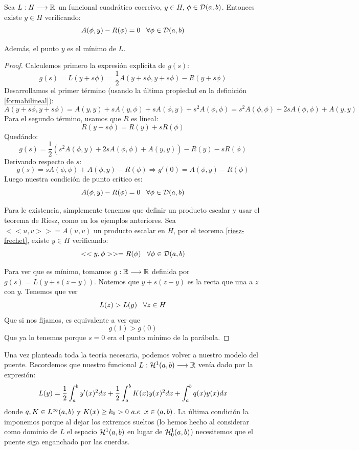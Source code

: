 \begin{prop}
\label{puntocritico}
Sea $L : H \longrightarrow \mathbb{R}$ un funcional cuadrático coercivo, $y\in H$, $\phi\in\mathcal{D}(a,b)$. Entonces existe $y\in H$ verificando:
\[
A(\phi,y)-R(\phi)=0 \;\;\; \forall\phi\in\mathcal{D}(a,b)
\]

Además, el punto $y$ es el mínimo de $L$.
\end{prop}
\begin{proof}
Calculemos primero la expresión explícita de $g(s)$:
\[
g(s)=L(y+s\phi)=\frac{1}{2}A(y+s\phi,y+s\phi)-R(y+s\phi)
\]
Desarrollamos el primer término (usando la última propiedad en la definición \ref{formabilineal}):
\[
A(y+s\phi,y+s\phi)=A(y,y)+sA(y,\phi)+sA(\phi,y)+s^2A(\phi,\phi)=s^2A(\phi,\phi)+2sA(\phi,\phi)+A(y,y)
\]
Para el segundo término, usamos que $R$ es lineal:
\[
R(y+s\phi)=R(y)+sR(\phi)
\]
Quedándo:
\[
g(s)=\frac{1}{2}\left(s^2A(\phi,y)+2sA(\phi,\phi)+A(y,y)\right)-R(y)-sR(\phi)
\]
Derivando respecto de $s$:
\[
g(s)=sA(\phi,\phi)+A(\phi,y)-R(\phi) \Rightarrow g'(0)=A(\phi,y)-R(\phi)
\]
Luego nuestra condición de punto crítico es:
\[
A(\phi,y)-R(\phi)=0 \;\;\; \forall\phi\in\mathcal{D}(a,b)
\]

Para le existencia, simplemente tenemos que definir un producto escalar y usar el teorema de Riesz, como en los ejemplos anteriores. Sea $<<u,v>>=A(u,v)$ un producto escalar en $H$, por el teorema \ref{riesz-frechet}, existe $y\in H$ verificando:
\[
<<y,\phi>>=R(\phi) \;\;\; \forall \phi\in\mathcal{D}(a,b)
\]

Para ver que es mínimo, tomamos $g : \mathbb{R} \longrightarrow \mathbb{R}$ definida por $g(s)=L(y+s(z-y))$. Notemos que $y+s(z-y)$ es la recta que una a $z$ con $y$. Tenemos que ver
\[
L(z)>L(y) \;\;\; \forall z\in H
\]
Que si nos fijamos, es equivalente a ver que
\[
g(1)>g(0)
\]
Que ya lo tenemos porque $s=0$ era el punto mínimo de la parábola.
\end{proof}

Una vez planteada toda la teoría necesaria, podemos volver a nuestro modelo del puente. Recordemos que nuestro funcional  $L : \mathcal{H}^{ 1 } (a,b) \longrightarrow \mathbb{R}$ venía dado por la expresión:
\[
L(y)=\frac{1}{2}\displaystyle\int_{ a }^{ b } y'(x)^2dx+\frac{1}{2}\displaystyle\int_{ a }^{ b } K(x)y(x)^2dx+\displaystyle\int_{ a }^{ b } q(x)y(x)dx
\]
donde $q,K\in L^{ \infty }(a,b)$ y $K(x)\geq k_0 >0\ a.e \;\; x\in(a,b)$. La última condición la imponemos porque al dejar los extremos sueltos (lo hemos hecho al considerar como dominio de $L$ el espacio $\mathcal{H}^{ 1 } (a,b)$ en lugar de $\mathcal{H}_0^{ 1 } (a,b)$) necesitemos que el puente siga enganchado por las cuerdas.

